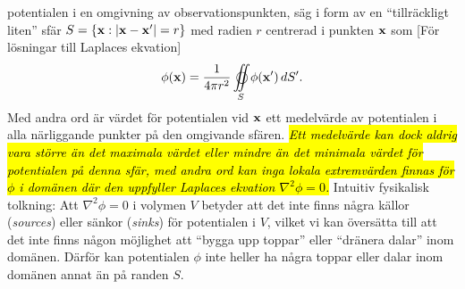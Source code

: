 {{{  potentialen} i en omgivning av observationspunkten, s{\"a}g i form av en
  ``tillr{\"a}ckligt liten'' sf{\"a}r $S=\{{\bf x}:|{\bf x}-{\bf x}'|=r\}$
  med radien $r$ centrerad i punkten ${\bf x}$ som
  [F{\"o}r l{\"o}sningar till Laplaces ekvation]
  \hl{$$
    \phi({\bf x})={{1}\over{4\pi r^2}}\oiint_{S}\phi({\bf x}')\,dS'.
  $$}
  Med andra ord {\"a}r v{\"a}rdet f{\"o}r potentialen vid ${\bf x}$ ett
  medelv{\"a}rde av potentialen i alla n{\"a}rliggande punkter p{\aa} den
  omgivande sf{\"a}ren. {\hl{\it Ett medelv{\"a}rde kan dock aldrig vara
  st{\"o}rre {\"a}n det maximala v{\"a}rdet eller mindre {\"a}n det minimala
  v{\"a}rdet f{\"o}r potentialen p{\aa} denna sf{\"a}r, med andra ord kan
  inga lokala extremv{\"a}rden finnas f{\"o}r $\phi$ i dom{\"a}nen d{\"a}r
  den uppfyller Laplaces ekvation $\nabla^2\phi=0$.}}}
\bigskip
\noindent
Intuitiv fysikalisk tolkning: Att $\nabla^2\phi=0$ i volymen $V$ betyder att det
inte finns n{\aa}gra k{\"a}llor ({\it sources}) eller s{\"a}nkor ({\it sinks})
f{\"o}r potentialen i $V$, vilket vi kan {\"o}vers{\"a}tta till att det inte
finns n{\aa}gon m{\"o}jlighet att ``bygga upp toppar'' eller ``dr{\"a}nera
dalar'' inom dom{\"a}nen. D{\"a}rf{\"o}r kan potentialen $\phi$ inte heller ha
n{\aa}gra toppar eller dalar inom dom{\"a}nen annat {\"a}n p{\aa} randen $S$.
\vfill\eject

}
